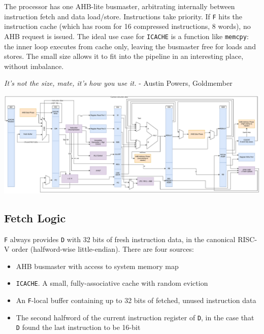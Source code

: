 \documentclass{article}
\begin{document}
The processor has one AHB-lite busmaster, arbitrating internally between instruction fetch and data load/store. Instructions take priority. If \texttt{F} hits the instruction cache (which has room for 16 compressed instructions, 8 words), no AHB request is issued. The ideal use case for \texttt{ICACHE} is a function like \texttt{memcpy}: the inner loop executes from cache only, leaving the busmaster free for loads and stores. The small size allows it to fit into the pipeline in an interesting place, without imbalance.

\begin{displayquote}
\textit{It's not the size, mate, it's how you use it.} - Austin Powers, Goldmember
\end{displayquote}


\newpage

\begin{center}
	\begin{sideways}
		\begin{minipage}{\textheight}
			\includegraphics[width=\textheight]{diagrams/cpu_full.pdf}
			\label{diagram:cpu_pipeline}
		\end{minipage}
	\end{sideways}
\end{center}

\newpage

\subsection{Fetch Logic}

\texttt{F} always provides \texttt{D} with 32 bits of fresh instruction data, in the canonical RISC-V order (halfword-wise little-endian). There are four sources:

\begin{itemize}
\item AHB busmaster with access to system memory map
\item \texttt{ICACHE}. A small, fully-associative cache with random eviction
\item An \texttt{F}-local buffer containing up to 32 bits of fetched, unused instruction data
\item The second halfword of the current instruction register of \texttt{D}, in the case that \texttt{D} found the last instruction to be 16-bit
\end{itemize}
\end{document}
